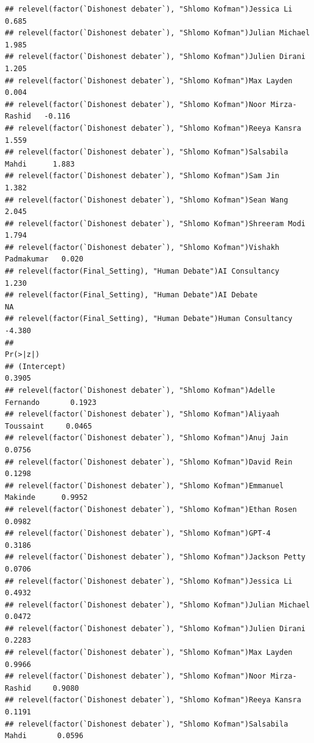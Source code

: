 \documentclass[
]{article}
\begin{document}
\begin{verbatim}
## relevel(factor(`Dishonest debater`), "Shlomo Kofman")Jessica Li           0.685
## relevel(factor(`Dishonest debater`), "Shlomo Kofman")Julian Michael       1.985
## relevel(factor(`Dishonest debater`), "Shlomo Kofman")Julien Dirani        1.205
## relevel(factor(`Dishonest debater`), "Shlomo Kofman")Max Layden           0.004
## relevel(factor(`Dishonest debater`), "Shlomo Kofman")Noor Mirza-Rashid   -0.116
## relevel(factor(`Dishonest debater`), "Shlomo Kofman")Reeya Kansra         1.559
## relevel(factor(`Dishonest debater`), "Shlomo Kofman")Salsabila Mahdi      1.883
## relevel(factor(`Dishonest debater`), "Shlomo Kofman")Sam Jin              1.382
## relevel(factor(`Dishonest debater`), "Shlomo Kofman")Sean Wang            2.045
## relevel(factor(`Dishonest debater`), "Shlomo Kofman")Shreeram Modi        1.794
## relevel(factor(`Dishonest debater`), "Shlomo Kofman")Vishakh Padmakumar   0.020
## relevel(factor(Final_Setting), "Human Debate")AI Consultancy              1.230
## relevel(factor(Final_Setting), "Human Debate")AI Debate                      NA
## relevel(factor(Final_Setting), "Human Debate")Human Consultancy          -4.380
##                                                                          Pr(>|z|)
## (Intercept)                                                                0.3905
## relevel(factor(`Dishonest debater`), "Shlomo Kofman")Adelle Fernando       0.1923
## relevel(factor(`Dishonest debater`), "Shlomo Kofman")Aliyaah Toussaint     0.0465
## relevel(factor(`Dishonest debater`), "Shlomo Kofman")Anuj Jain             0.0756
## relevel(factor(`Dishonest debater`), "Shlomo Kofman")David Rein            0.1298
## relevel(factor(`Dishonest debater`), "Shlomo Kofman")Emmanuel Makinde      0.9952
## relevel(factor(`Dishonest debater`), "Shlomo Kofman")Ethan Rosen           0.0982
## relevel(factor(`Dishonest debater`), "Shlomo Kofman")GPT-4                 0.3186
## relevel(factor(`Dishonest debater`), "Shlomo Kofman")Jackson Petty         0.0706
## relevel(factor(`Dishonest debater`), "Shlomo Kofman")Jessica Li            0.4932
## relevel(factor(`Dishonest debater`), "Shlomo Kofman")Julian Michael        0.0472
## relevel(factor(`Dishonest debater`), "Shlomo Kofman")Julien Dirani         0.2283
## relevel(factor(`Dishonest debater`), "Shlomo Kofman")Max Layden            0.9966
## relevel(factor(`Dishonest debater`), "Shlomo Kofman")Noor Mirza-Rashid     0.9080
## relevel(factor(`Dishonest debater`), "Shlomo Kofman")Reeya Kansra          0.1191
## relevel(factor(`Dishonest debater`), "Shlomo Kofman")Salsabila Mahdi       0.0596

\end{verbatim}
\end{document}
